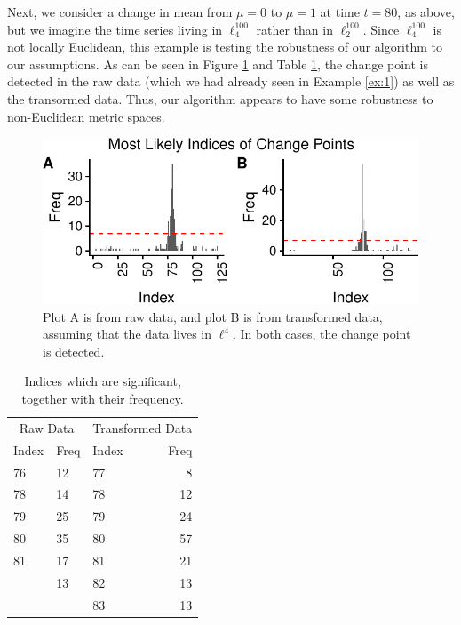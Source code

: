 \documentclass[smallextended]{svjour3}       %
\begin{document}
\begin{example} Next, we consider a change in mean from $\mu = 0$ to $\mu = 1$ at time $t = 80$, as above, but we imagine the time series living in \(\ell_{4}^{100}\) rather than in \(\ell_{2}^{100}\). Since $\ell_{4}^{100}$ is not locally Euclidean, this example is testing the robustness of our algorithm to our assumptions. As can be seen in Figure \ref{fig:4} and Table \ref{tab:chunk_5_75}, the change point is detected in the raw data (which we had already seen in Example \ref{ex:1}) as well as the transormed data. Thus, our algorithm appears to have some robustness to non-Euclidean metric spaces.

\begin{figure}[H]\includegraphics{springer_template_files/figure-latex/chunk_5_5-1} 
\caption{Plot A is from raw data, and plot B is from transformed data, assuming that the data lives in $\ell^4$. In both cases, the change point is detected.}
\label{fig:4}\end{figure}

\begin{longtable}[t]{lllr}
\caption{\label{tab:chunk_5_75}Indices which are significant, together with their frequency.}\\
\toprule
\multicolumn{2}{c}{Raw Data} & \multicolumn{2}{c}{Transformed Data} \\
\cmidrule(l{2pt}r{2pt}){1-2} \cmidrule(l{2pt}r{2pt}){3-4}
Index & Freq & Index & Freq\\
\midrule
76 & 12 & 77 & 8\\
78 & 14 & 78 & 12\\
79 & 25 & 79 & 24\\
80 & 35 & 80 & 57\\
81 & 17 & 81 & 21\\
\addlinespace
82 & 13 & 82 & 13\\
 &  & 83 & 13\\
\bottomrule
\end{longtable}
\end{example}
\end{document}
